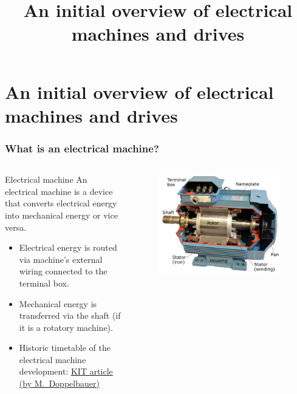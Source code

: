 \section{An initial overview of electrical machines and drives}
\title[Initial overview]{An initial overview of electrical machines and drives}
 
\begin{frame}[plain]
    \titlepage
\end{frame}

\begin{frame}
	\frametitle{What is an electrical machine?}
	\begin{columns}
		\begin{column}{0.5\textwidth}
			\begin{varblock}{Electrical machine}
				An electrical machine is a device that converts electrical energy into  mechanical energy or vice versa.
			\end{varblock}
			\vspace{0.25cm}
			\begin{itemize}
				\item<2-> Electrical energy is routed via machine's external wiring connected to the terminal box.
				\item<3-> Mechanical energy is transferred via the shaft (if it is a rotatory machine).
				\item<4-> Historic timetable of the electrical machine development: \href{https://www.eti.kit.edu/english/1376.php}{KIT article (by M.~Doppelbauer)}
			\end{itemize}
		\end{column}
		\begin{column}{0.5\textwidth}
			\begin{figure}
				\centering
				\includegraphics[width=0.95\textwidth]{fig/lec01/Induction_machine_opened.pdf}

\end{figure}
\end{column}
\end{columns}
\end{frame}
